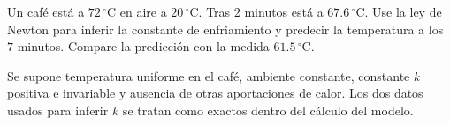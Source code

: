 Un café está a $72\,{}^\circ\mathrm C$ en aire a $20\,{}^\circ\mathrm C$. Tras $2$ minutos está a $67.6\,{}^\circ\mathrm C$. Use la ley de Newton para inferir la constante de enfriamiento y predecir la temperatura a los $7$ minutos. Compare la predicción con la medida $61.5\,{}^\circ\mathrm C$.

Se supone temperatura uniforme en el café, ambiente constante, constante $k$ positiva e invariable y ausencia de otras aportaciones de calor. Los dos datos usados para inferir $k$ se tratan como exactos dentro del cálculo del modelo.
